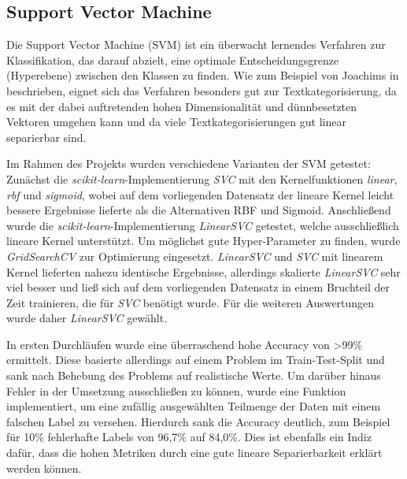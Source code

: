 \subsection{Support Vector Machine}
\label{SVM}

Die Support Vector Machine (SVM) ist ein überwacht lernendes Verfahren zur Klassifikation, das darauf abzielt, eine optimale Entscheidungsgrenze (Hyperebene) zwischen den Klassen zu finden. Wie zum Beispiel von Joachims in \cite{Joachims1998} beschrieben, eignet sich das Verfahren besonders gut zur Textkategorisierung, da es mit der dabei auftretenden hohen Dimensionalität und dünnbesetzten Vektoren umgehen kann und da viele Textkategorisierungen gut linear separierbar sind.

Im Rahmen des Projekts wurden verschiedene Varianten der SVM getestet: Zunächst die \textit{scikit-learn}-Implementierung \textit{SVC} mit den Kernelfunktionen \textit{linear}, \textit{rbf} und \textit{sigmoid}, wobei auf dem vorliegenden Datensatz der lineare Kernel leicht bessere Ergebnisse lieferte als die Alternativen RBF und Sigmoid. Anschließend wurde die \textit{scikit-learn}-Implementierung \textit{LinearSVC} getestet, welche ausschließlich lineare Kernel unterstützt.  Um möglichst gute Hyper-Parameter zu finden, wurde \textit{GridSearchCV} zur Optimierung eingesetzt. \textit{LinearSVC} und \textit{SVC} mit linearem Kernel lieferten nahezu identische Ergebnisse, allerdings skalierte \textit{LinearSVC} sehr viel besser und ließ sich auf dem vorliegenden Datensatz in einem Bruchteil der Zeit trainieren, die für \textit{SVC} benötigt wurde. Für die weiteren Auswertungen wurde daher \textit{LinearSVC} gewählt.

In ersten Durchläufen wurde eine überraschend hohe Accuracy von >99\% ermittelt. Diese basierte allerdings auf einem Problem im Train-Test-Split und sank nach Behebung des Problems auf realistische Werte. Um darüber hinaus Fehler in der Umsetzung ausschließen zu können, wurde eine Funktion implementiert, um eine zufällig ausgewählten Teilmenge der Daten mit einem falschen Label zu versehen. Hierdurch sank die Accuracy deutlich, zum Beispiel für 10\% fehlerhafte Labels von 96,7\% auf 84,0\%. Dies ist ebenfalls ein Indiz dafür, dass die hohen Metriken durch eine gute lineare Separierbarkeit erklärt werden können.
